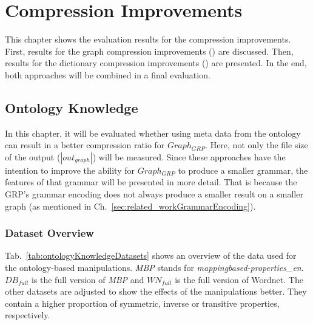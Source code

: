 \section{Compression Improvements}

This chapter shows the evaluation results for the compression improvements. First, results for the graph compression improvements (\GGRP)  are discussed. Then, results for the dictionary compression improvements (\DHDT) are presented.  In the end, both approaches will be combined in a final evaluation.

\subsection{Ontology Knowledge}\label{sec:evaluationOntKnowledge}

In this chapter, it will be evaluated whether using meta data from the ontology can result in a better compression ratio for $Graph_{GRP}$. Here, not only the file size of the output ($|out_{graph}|$) will be measured. Since these approaches have the intention to improve the ability for $Graph_{GRP}$ to produce a smaller grammar, the features of that grammar will be presented in more detail. That is because the GRP's grammar encoding does not always produce a smaller result on a smaller graph (as mentioned in Ch.~\ref{sec:related_workGrammarEncoding}).

\subsubsection{Dataset Overview}

Tab.~\ref{tab:ontologyKnowledgeDatasets} shows an overview of the data used for the ontology-based manipulations. \textit{MBP} stands for \textit{mappingbased-properties\_en}. $DB_{full}$ is the full version of \textit{MBP} and $WN_{full}$ is the full version of Wordnet. The other datasets are adjusted to show the effects of the manipulations better. They contain a higher proportion of symmetric, inverse or transitive properties, respectively.

